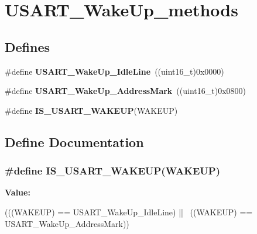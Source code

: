 \hypertarget{group__USART__WakeUp__methods}{
\section{USART\_\-WakeUp\_\-methods}
\label{group__USART__WakeUp__methods}
}
\subsection*{Defines}
\begin{DoxyCompactItemize}
\item 
\hypertarget{group__USART__WakeUp__methods_ga9646d71590d5cef29ee12da0bb431d92}{
\#define {\bfseries USART\_\-WakeUp\_\-IdleLine}~((uint16\_\-t)0x0000)}
\label{group__USART__WakeUp__methods_ga9646d71590d5cef29ee12da0bb431d92}

\item 
\hypertarget{group__USART__WakeUp__methods_ga9f63c1671060682adee91b9a2f3202e4}{
\#define {\bfseries USART\_\-WakeUp\_\-AddressMark}~((uint16\_\-t)0x0800)}
\label{group__USART__WakeUp__methods_ga9f63c1671060682adee91b9a2f3202e4}

\item 
\#define {\bfseries IS\_\-USART\_\-WAKEUP}(WAKEUP)
\end{DoxyCompactItemize}


\subsection{Define Documentation}
\hypertarget{group__USART__WakeUp__methods_ga3611be417bdb82f42dc2ca17584271f9}{
\subsubsection[{IS\_\-USART\_\-WAKEUP}]{\setlength{\rightskip}{0pt plus 5cm}\#define IS\_\-USART\_\-WAKEUP(WAKEUP)}}
\label{group__USART__WakeUp__methods_ga3611be417bdb82f42dc2ca17584271f9}
{\bfseries Value:}
\begin{DoxyCode}
(((WAKEUP) == USART_WakeUp_IdleLine) || \
                                 ((WAKEUP) == USART_WakeUp_AddressMark))
\end{DoxyCode}
